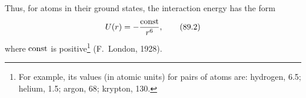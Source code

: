 Thus, for atoms in their ground states, the interaction energy has the form
\begin{equation}
U(r)=-\frac{\mathop{\rm const}\nolimits}{r^6},
\tag{89.2}
\end{equation}
where $\mathop{\rm const}\nolimits$ is positive\footnote{For example, its values (in atomic units) for pairs of atoms are: hydrogen, 6.5; helium, 1.5; argon, 68; krypton, 130.} (F.~London, 1928).
